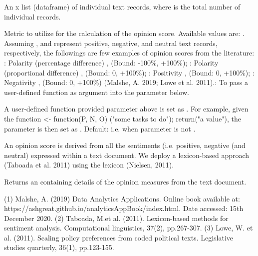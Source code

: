 \documentclass[a4paper]{book}
\begin{document}
\begin{Arguments}
\begin{ldescription}
\item[\code{textdoc}] An  x  list (dataframe) of
individual text records, where  is the total
number of individual records.

\item[\code{metric}]  Metric to utilize for the calculation
of the opinion score. Available values are: .
Assuming ,  and  represent positive,
negative, and neutral text records, respectively, the followings
are few examples of opinion scores from the literature:
: Polarity (percentage difference)
, (Bound: -100\%, +100\%);
: Polarity (proportional difference)
,
(Bound: 0, +100\%);
: Positivity ,
(Bound: 0, +100\%); : Negativity ,
(Bound: 0, +100\%) (Malshe, A. 2019;
Lowe et al. 2011).: To pass a
user-defined function as argument into the  parameter below.

\item[\code{fun}] A user-defined function provided parameter
 above is set as .
For example, given the function  <- function(P, N, O)
("some tasks to do"); return("a value"), the
 parameter is then set as .
Default:  i.e. when  parameter
is not .
\end{ldescription}
\end{Arguments}
%
\begin{Details}\relax
An opinion score is derived from all the sentiments
(i.e. positive, negative (and neutral) expressed within a
text document. We deploy a lexicon-based approach
(Taboada et al. 2011) using the  lexicon
(Nielsen, 2011).
\end{Details}
%
\begin{Value}
Returns an  containing details of the
opinion measures from the text document.
\end{Value}
%
\begin{References}\relax
(1) Malshe, A. (2019) Data Analytics Applications.
Online book available at:
https://ashgreat.github.io/analyticsAppBook/index.html.
Date accessed: 15th December 2020.
(2) Taboada, M.et al. (2011).
Lexicon-based methods for sentiment analysis. Computational
linguistics, 37(2), pp.267-307.
(3) Lowe, W. et al. (2011).
Scaling policy preferences from coded political texts.
Legislative studies quarterly, 36(1), pp.123-155.
\end{References}
\end{document}
